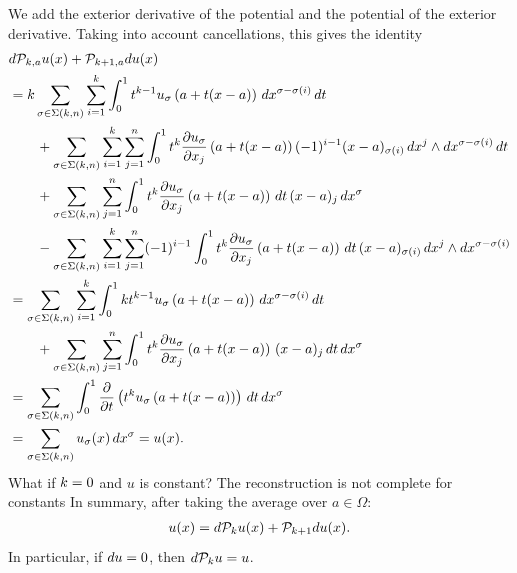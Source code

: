 \documentclass[10pt,letterpaper]{article}
\newcommand{\mwl}[1]{{\color{red}#1}}
\begin{document}
We add the exterior derivative of the potential and the potential of the exterior derivative.
Taking into account cancellations, this gives the identity 
\begin{align*}
    &
    d {\mathcal P}_{k,a} u(x)
    +
    {\mathcal P}_{k+1,a} d u(x)
    \\&
    =
    k
    \sum_{\sigma \in \Sigma(k,n)} \sum_{i=1}^{k}
    \int_{0}^{1} 
    t^{k-1} u_{\sigma}\left(a+t(x-a)\right) \,dx^{\sigma-\sigma(i)} \,dt 
    \\&\qquad
    + 
    \sum_{\sigma \in \Sigma(k,n)} \sum_{i=1}^{k} \sum_{j=1}^{n}
    \int_{0}^{1} 
    t^{k} \frac{ \partial u_{\sigma} }{\partial x_{j}}\left(a+t(x-a)\right) (-1)^{i-1} (x-a)_{\sigma(i) } \,dx^{j} \wedge dx^{\sigma-\sigma(i)} \,dt 
    \\&\qquad
    +
    \sum_{\sigma \in \Sigma(k,n)} \sum_{j=1}^{n}
    \int_{0}^{1} t^{k} \frac{ \partial u_{\sigma} }{\partial x_{j}}\left(a+t(x-a)\right) \,dt \,(x-a)_{j} \,dx^{\sigma}
    \\&\qquad
    - 
    \sum_{\sigma \in \Sigma(k,n)} \sum_{i=1}^{k} \sum_{j=1}^{n}
    (-1)^{i-1}
    \int_{0}^{1} t^{k} \frac{ \partial u_{\sigma} }{\partial x_{j}}\left(a+t(x-a)\right) \,dt 
    \,(x-a)_{\sigma(i)} \,dx^{j} \wedge dx^{\sigma-\sigma(i)}
    \\&
    =
    \sum_{\sigma \in \Sigma(k,n)} \sum_{i=1}^{k}
    \int_{0}^{1} 
    k t^{k-1} u_{\sigma}\left(a+t(x-a)\right) \,dx^{\sigma-\sigma(i)} \,dt 
    \\&\qquad
    +
    \sum_{\sigma \in \Sigma(k,n)} \sum_{j=1}^{n}
    \int_{0}^{1} t^{k} \frac{ \partial u_{\sigma} }{\partial x_{j}}\left(a+t(x-a)\right) \,(x-a)_{j} \,dt \,dx^{\sigma}
    \\&
    =
    \sum_{\sigma \in \Sigma(k,n)} 
    \int_{0}^{1} \frac{\partial}{\partial t} \left( t^{k} u_{\sigma}\left(a+t(x-a)\right) \right) \,dt \,dx^{\sigma}
    \\&
    =
    \sum_{\sigma \in \Sigma(k,n)} 
    u_{\sigma}(x) \,dx^{\sigma}
    =
    u(x)
    .
\end{align*}
\mwl{What if $k = 0$ and $u$ is constant? The reconstruction is not complete for constants}
In summary, after taking the average over $a \in \Omega$:
\begin{align*}
    u(x) = d {\mathcal P}_{k} u(x) + {\mathcal P}_{k+1} d u(x).
\end{align*}
In particular, if $d u = 0$, then $d {\mathcal P}_{k} u = u$.
\end{document}
